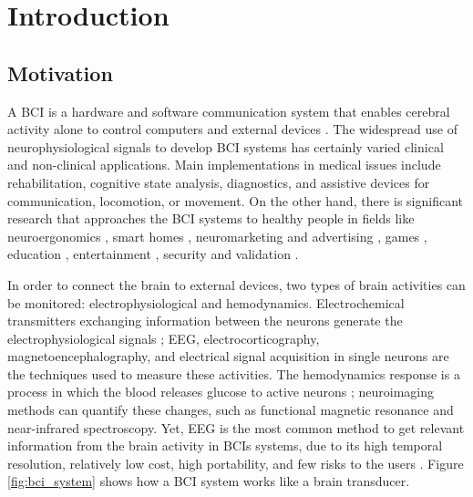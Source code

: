\chapter{Introduction}\label{ch:introduction}

\section{Motivation}\label{sec:motivation}

A \gls*{BCI} is a hardware and software communication system that enables cerebral activity alone to control computers and external devices \cite{nicolas2012brain}. The widespread use of neurophysiological signals to develop \gls*{BCI} systems has certainly varied clinical and non-clinical applications. Main implementations in medical issues include rehabilitation, cognitive state analysis, diagnostics, and assistive devices for communication, locomotion, or movement. On the other hand, there is significant research that approaches the \gls*{BCI} systems to healthy people in fields like neuroergonomics \cite{tremmel2019estimating}, smart homes \cite{maleki2021brain}, neuromarketing and advertising \cite{polat2021eeg}, games \cite{vasiljevic2020brain}, education \cite{taherian2018caregiver}, entertainment \cite{mudgal2020brain}, security and validation \cite{bansal2019eeg}.

In order to connect the brain to external devices, two types of brain activities can be monitored: electrophysiological and hemodynamics. Electrochemical transmitters exchanging information between the neurons generate the electrophysiological signals \cite{baillet2001electromagnetic}; \gls*{EEG}, electrocorticography, magnetoencephalography, and electrical signal acquisition in single neurons are the techniques used to measure these activities. The hemodynamics response is a process in which the blood releases glucose to active neurons \cite{laureys2009functional}; neuroimaging methods can quantify these changes, such as functional magnetic resonance and near-infrared spectroscopy. Yet, \gls*{EEG} is the most common method to get relevant information from the brain activity in \glspl*{BCI} systems, due to its high temporal resolution, relatively low cost, high portability, and few risks to the users \cite{nicolas-alonso_brain_2012}. Figure \ref{fig:bci_system} shows how a \gls*{BCI} system works like a brain transducer.



